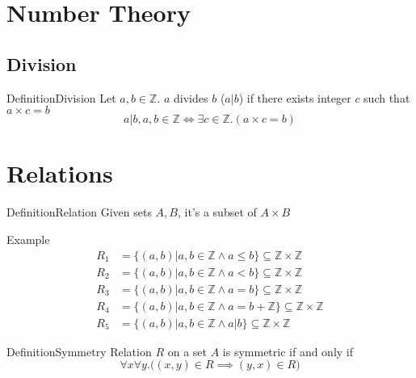 \documentclass{MathNotes}
\newenvironment{example}[1]{\begin{BlueBox}{Example}{#1}}{\end{BlueBox}}
\newenvironment{definition}[1]{\begin{RedBox}{Definition}{#1}}{\end{RedBox}}
\begin{document}
\newpage
\section{Number Theory}
\subsection{Division}
\begin{definition}{Division}\label{def:division}
	Let $a,b\in\mathbb{Z}$. $a$ divides $b$ ($a|b$) if there exists integer $c$ such that $a\times c=b$
	\[a|b,a,b\in\mathbb{Z}\iff\exists c\in\mathbb{Z}.(a\times c=b)\]
\end{definition}

\section{Relations}
\begin{definition}{Relation}
	Given sets $A,B$, it's a subset of $A\times B$
\end{definition}

\begin{example}{}
	\begin{align*}
		R_1 & = \{(a,b)|a,b\in\mathbb{Z}\land a\leq b\}\subseteq\mathbb{Z}\times\mathbb{Z}        \\
		R_2 & = \{(a,b)|a,b\in\mathbb{Z}\land a<b\}\subseteq\mathbb{Z}\times\mathbb{Z}            \\
		R_3 & = \{(a,b)|a,b\in\mathbb{Z}\land a=b\}\subseteq\mathbb{Z}\times\mathbb{Z}            \\
		R_4 & = \{(a,b)|a,b\in\mathbb{Z}\land a=b+\mathbb{Z}\}\subseteq\mathbb{Z}\times\mathbb{Z} \\
		R_5 & = \{(a,b)|a,b\in\mathbb{Z}\land a|b\}\subseteq\mathbb{Z}\times\mathbb{Z}
	\end{align*}
\end{example}

\begin{definition}{Symmetry}
	Relation $R$ on a set $A$ is symmetric if and only if
	\[\forall x\forall y.\big((x,y)\in R\implies(y,x)\in R\big)\]
\end{definition}
\end{document}
